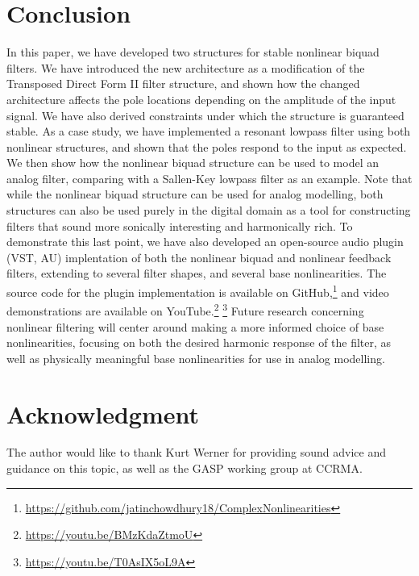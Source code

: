 \documentclass{IEEEtran}
\begin{document}
\section{Conclusion}

In this paper, we have developed two structures for stable nonlinear biquad
filters. We have introduced the new architecture as a modification of the
Transposed Direct Form II filter structure, and shown
how the changed architecture affects the pole locations depending on
the amplitude of the input signal. We have also derived constraints under
which the structure is guaranteed stable.
\newline\newline
As a case study, we have implemented
a resonant lowpass filter using both nonlinear
structures, and shown that the
poles respond to the input as expected. We then show how the
nonlinear biquad structure can be used to model an analog
filter, comparing with a Sallen-Key lowpass filter as
an example. Note that while the nonlinear biquad structure
can be used for analog modelling, both structures can also be
used purely in the digital domain as a tool for constructing
filters that sound more sonically interesting and harmonically
rich.
\newline\newline
To demonstrate this last point, we have also developed an open-source
audio plugin (VST, AU) implentation of both the nonlinear biquad and
nonlinear feedback filters, extending to several filter shapes, and
several base nonlinearities.
The source code for the plugin implementation is available on
GitHub,\footnote{\url{https://github.com/jatinchowdhury18/ComplexNonlinearities}}
and video demonstrations are available on YouTube.\footnote{\url{https://youtu.be/BMzKdaZtmoU}}
\footnote{\url{https://youtu.be/T0AsIX5oL9A}}
\newline\newline
Future research concerning nonlinear filtering will center around making a
more informed choice of base nonlinearities, focusing on both the desired
harmonic response of the filter, as well as physically meaningful base
nonlinearities for use in analog modelling.

\section*{Acknowledgment}

The author would like to thank Kurt Werner for providing sound advice and
guidance on this topic, as well as the GASP working group at CCRMA.
\end{document}

